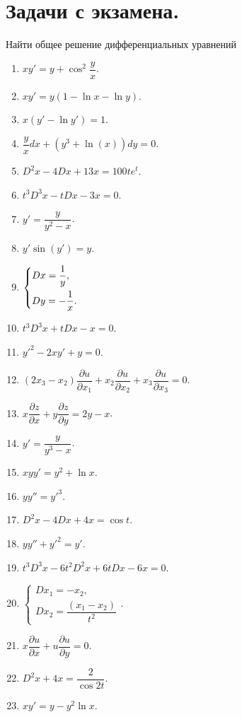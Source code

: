 \documentclass[a4paper, 12pt]{report}
\date{}
\numberwithin{equation}{section}
\renewcommand{\d}{\partial}
\begin{document}
	\newpage
	\section*{Задачи с экзамена.}
	Найти общее решение дифференциальных уравнений
	\begin{enumerate}
		\item $xy' =y+ \cos^2\dfrac y x$.
		\item $xy'=y(1-\ln x-\ln y)$.
		\item $x(y'-\ln y')=1$.
		\item $\dfrac y xdx + (y^3 + \ln(x))dy =0.$
		\item $D^2x-4Dx+13x=100te^t$.
		\item $t^3D^3x-tDx-3x=0$.
		\item $y'=\dfrac{y}{y^2-x}$.
		\item $y'\sin(y')=y$.
		\item $\begin{dcases}
			Dx = \dfrac 1 y,\\
			Dy = - \dfrac 1 x.
		\end{dcases}$
		\item $t^3D^3x + tDx - x = 0$.
		\item $y'^2-2 x y' + y = 0$.
		\item $(2x_3 - x_2)\dfrac {\d u}{\d x_1} + x_2\dfrac{\d u}{\d x_2}+x_3\dfrac{\d u}{\d x_3} = 0.$
		\item $x \dfrac{\d z}{\d x} + y \dfrac{\d z}{\d y} = 2 y - x$.
		\item $y'=\dfrac{y}{y^3-x}$.
		\item $ x y y' = y^2 + \ln x$.
		\item $y y'' = y'^3$.
		\item $D^2x - 4Dx + 4x = \cos t$.
		\item $y y'' + y'^2 = y'$.
		\item $t^3 D^3 x - 6t^2 D^2 x + 6tDx - 6x = 0$.
		\item $\begin{cases}
			Dx_1=-x_2,\\ Dx_2=\dfrac{(x_1 - x_2)}{t^2}
		\end{cases}$.
		\item $x \dfrac{\d u}{\d x} + u \dfrac{\d u}{\d y} = 0$.
		\item $D^2x+4x = \dfrac{2}{\cos 2 t}$.
		\item $xy'=y-y^2\ln x$.
	\end{enumerate}
	
\end{document}
